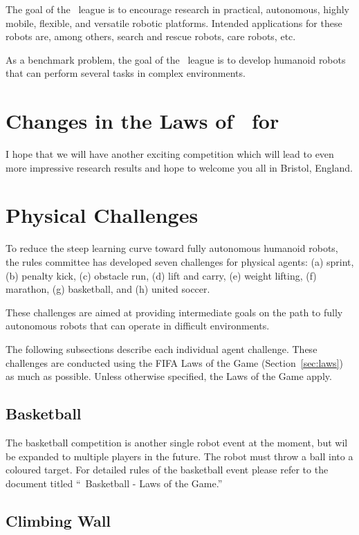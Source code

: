 \documentclass[12pt]{hurocup}
\begin{document}
The goal of the \HuroCup\ league is to encourage research in
practical, autonomous, highly mobile, flexible, and versatile robotic
platforms. Intended applications for these robots are, among others,
search and rescue robots, care robots, etc.

As a benchmark problem, the goal of the \HuroCup\ league is to develop
humanoid robots that can perform several tasks in complex environments.

\section{Changes in the Laws of \HuroCup\ for \thisyear}

I hope that we will have another exciting competition which will lead
to even more impressive research results and hope to welcome you all
in Bristol, England.

\section{Physical Challenges}    
\label{sec:physical-challenges}

To reduce the steep learning curve toward fully autonomous humanoid
robots, the rules committee has developed seven challenges for
physical agents: (a) sprint, (b) penalty kick, (c) obstacle run, (d)
lift and carry, (e) weight lifting, (f) marathon, (g) basketball, and
(h) united soccer. 

These challenges are aimed at providing intermediate goals on the path
to fully autonomous robots that can operate in difficult environments.

The following subsections describe each individual agent
challenge. These challenges are conducted using the FIFA Laws of the
Game (Section~\ref{sec:laws}) as much as possible. Unless otherwise
specified, the Laws of the Game apply.

\subsection{Basketball}
\label{subsec:basketball}

The basketball competition is another single robot event at the
moment, but wil be expanded to multiple players in the future. The
robot must throw a ball into a coloured target. For detailed rules of
the basketball event please refer to the document titled ``\HuroCup\
Basketball - Laws of the Game.''

\subsection{Climbing Wall}
\label{subsec:climbing-wall}
\end{document}
